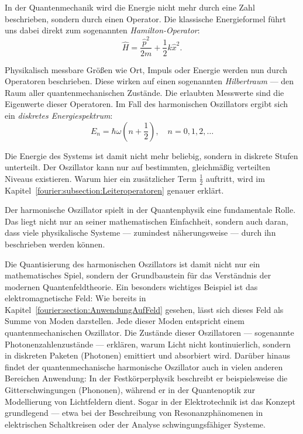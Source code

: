 	In der Quantenmechanik wird die Energie nicht mehr durch eine Zahl beschrieben, sondern durch einen Operator.  
	Die klassische Energieformel führt uns dabei direkt zum sogenannten \emph{Hamilton-Operator}:
	\begin{equation}
	\hat{H} = \frac{\hat{p}^2}{2m} + \frac{1}{2} k \hat{x}^2.
	\label{fourier:equation:derQMHO}
	\end{equation}

	Physikalisch messbare Größen wie Ort, Impuls oder Energie werden nun durch Operatoren beschrieben.  
	Diese wirken auf einen sogenannten \emph{Hilbertraum} — den Raum aller quantenmechanischen Zustände.  
	Die erlaubten Messwerte sind die Eigenwerte dieser Operatoren.  
	Im Fall des harmonischen Oszillators ergibt sich ein \emph{diskretes Energiespektrum}:
	\[
	E_n = \hbar \omega \left(n + \frac{1}{2} \right), \quad n = 0, 1, 2, \dots
	\]

	Die Energie des Systems ist damit nicht mehr beliebig, sondern in diskrete Stufen unterteilt.  
	Der Oszillator kann nur auf bestimmten, gleichmäßig verteilten Niveaus existieren.
	Warum hier ein zusätzlicher Term $\frac{1}{2}$ auftritt, wird im Kapitel~\ref{fourier:subsection:Leiteroperatoren} genauer erklärt.

	Der harmonische Oszillator spielt in der Quantenphysik eine fundamentale Rolle.  
	Das liegt nicht nur an seiner mathematischen Einfachheit, sondern auch daran, dass viele physikalische Systeme — zumindest näherungsweise — durch ihn beschrieben werden können.

	Die Quantisierung des harmonischen Oszillators ist damit nicht nur ein mathematisches Spiel, sondern der Grundbaustein für das Verständnis der modernen Quantenfeldtheorie.
	Ein besonders wichtiges Beispiel ist das elektromagnetische Feld:  
	Wie bereits in Kapitel~\ref{fourier:section:AnwendungAufFeld} gesehen, lässt sich dieses Feld als Summe von Moden darstellen.  
	Jede dieser Moden entspricht einem quantenmechanischen Oszillator.  
	Die Zustände dieser Oszillatoren — sogenannte Photonenzahlenzustände — erklären, warum Licht nicht kontinuierlich, sondern in diskreten Paketen (Photonen) emittiert und absorbiert wird.
	Darüber hinaus findet der quantenmechanische harmonische Oszillator auch in vielen anderen Bereichen Anwendung:
	In der Festkörperphysik beschreibt er beispielsweise die Gitterschwingungen (Phononen), während er in der Quantenoptik zur Modellierung von Lichtfeldern dient.
	Sogar in der Elektrotechnik ist das Konzept grundlegend ---
	etwa bei der Beschreibung von Resonanzphänomenen in elektrischen Schaltkreisen oder der Analyse schwingungsfähiger Systeme.

